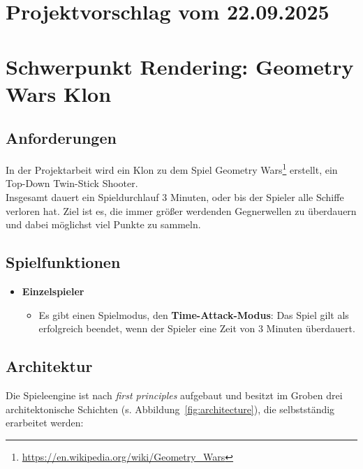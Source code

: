 
\section{Projektvorschlag vom 22.09.2025}\label{sec:projektvorschlag}

\section*{Schwerpunkt Rendering: Geometry Wars Klon}

\subsection{Anforderungen}

In der Projektarbeit wird ein Klon zu dem Spiel Geometry Wars\footnote{
\url{https://en.wikipedia.org/wiki/Geometry_Wars}
} erstellt, ein Top-Down Twin-Stick Shooter.\\

\noindent
Insgesamt dauert ein Spieldurchlauf 3 Minuten, oder bis der Spieler alle Schiffe verloren hat. Ziel ist es, die immer größer werdenden Gegnerwellen zu überdauern und dabei möglichst viel Punkte zu sammeln.



\subsection{Spielfunktionen}
\begin{itemize}
    \itemsep0.5em
    \item \textbf{Einzelspieler}
    \begin{itemize}
        \item Es gibt einen Spielmodus, den \textbf{Time-Attack-Modus}: Das Spiel gilt als erfolgreich beendet, wenn der Spieler eine Zeit von 3 Minuten überdauert.
    \end{itemize}
\end{itemize}

\subsection{Architektur}

Die Spieleengine ist nach \textit{first principles} aufgebaut und besitzt im Groben drei architektonische Schichten (s. Abbildung~\ref{fig:architecture}), die selbstständig erarbeitet werden:

